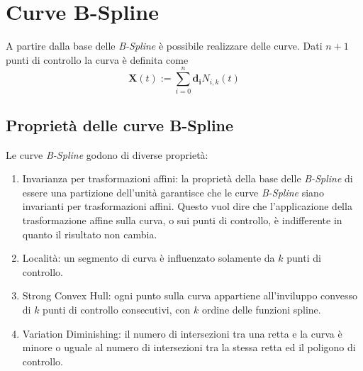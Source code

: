 \documentclass[a4paper, 12pt]{article}
\begin{document}
\section{Curve B-Spline}
A partire dalla base delle \textit{B-Spline} è possibile realizzare delle curve. Dati $n+1$ punti 
di controllo la curva è definita come 
$$\mathbf{X}(t) := \sum_{i=0}^{n} \mathbf{d_i} N_{i, k}(t)$$

\subsection{Proprietà delle curve B-Spline}
Le curve \textit{B-Spline} godono di diverse proprietà:
\begin{enumerate}
  \item Invarianza per trasformazioni affini: la proprietà della base delle \textit{B-Spline} di essere 
  una partizione dell'unità garantisce che le curve \textit{B-Spline} siano invarianti per trasformazioni affini. Questo 
  vuol dire che l'applicazione della trasformazione affine sulla curva, o sui punti di controllo, è indifferente in
  quanto il risultato non cambia.
  \item Località: un segmento di curva è influenzato solamente da $k$ punti di controllo.
  \item Strong Convex Hull: ogni punto sulla curva appartiene all'inviluppo convesso di $k$ punti di controllo consecutivi, con $k$ ordine 
  delle funzioni spline.
  \item Variation Diminishing: il numero di intersezioni tra una retta e la curva è minore o uguale al numero di intersezioni
  tra la stessa retta ed il poligono di controllo.
\end{enumerate}
\end{document}
